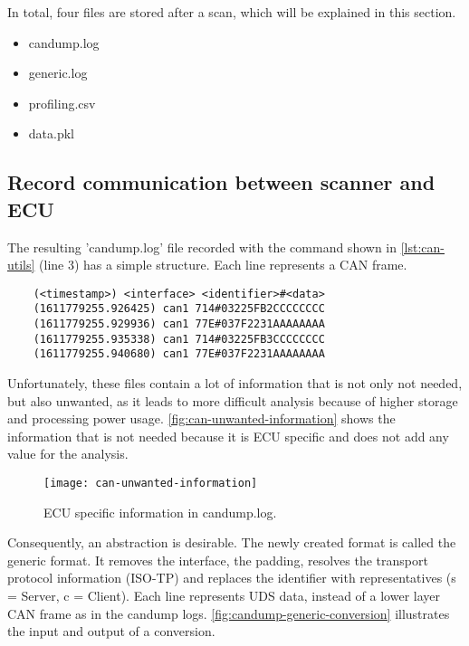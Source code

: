 In total, four files are stored after a scan, which will be explained in this section.

\begin{itemize}
    \item candump.log
    \item generic.log
    \item profiling.csv
    \item data.pkl
\end{itemize}

\subsection{Record communication between scanner and ECU}

The resulting 'candump.log' file recorded with the command shown in \autoref{lst:can-utils} (line 3) has a simple structure. 
Each line represents a CAN frame.

\begin{samepage}
\begin{verbatim}
    (<timestamp>) <interface> <identifier>#<data>
    (1611779255.926425) can1 714#03225FB2CCCCCCCC
    (1611779255.929936) can1 77E#037F2231AAAAAAAA
    (1611779255.935338) can1 714#03225FB3CCCCCCCC
    (1611779255.940680) can1 77E#037F2231AAAAAAAA
\end{verbatim}
\end{samepage}

Unfortunately, these files contain a lot of information that is not only not needed, but also unwanted, as it leads to more difficult analysis because of higher storage and processing power usage. 
\autoref{fig:can-unwanted-information} shows the information that is not needed because it is ECU specific and does not add any value for the analysis.

\begin{figure}[H]
    \centering
    \texttt{[image: can-unwanted-information]}
    \caption{ECU specific information in candump.log.}
    \label{fig:can-unwanted-information}
\end{figure}

Consequently, an abstraction is desirable. The newly created format is called the generic format.
It removes the interface, the padding, resolves the transport protocol information (ISO-TP) and replaces the identifier with representatives (s = Server, c = Client). Each line represents UDS data, instead of a lower layer CAN frame as in the candump logs. 
\autoref{fig:candump-generic-conversion} illustrates the input and output of a conversion.

